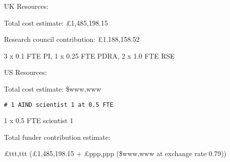 
UK Resources:

Total cost estimate: £1,485,198.15

Research council contribution: £1,188,158.52

3 x 0.1 FTE PI, 1 x 0.25 FTE PDRA, 2 x 1.0 FTE RSE

\vspace{0.1in}
US Resources:

Total cost estimate: \$www,www

\texttt{\# 1 AIND scientist 1 at 0.5 FTE}

1 x 0.5 FTE scientist 1

\vspace{0.1in}
Total funder contribution estimate:

£ttt,ttt (£1,485,198.15 + £ppp,ppp (\$www,www at exchange rate 0.79))

